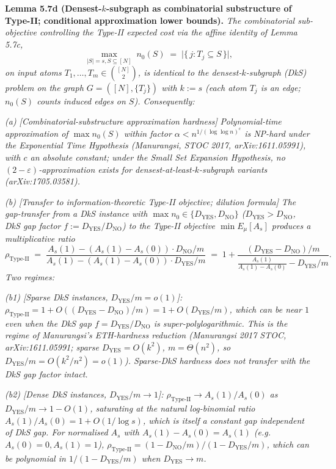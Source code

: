 \documentclass[
]{article}
\begin{document}
\textbf{Lemma 5.7d (Densest-$k$-subgraph as combinatorial substructure
of Type-II; conditional approximation lower bounds).}
\emph{The combinatorial sub-objective controlling the Type-II
expected cost via the affine identity of Lemma 5.7c,}
\[
\max_{|S| = s, S \subseteq [N]} \;
n_0(S) \;=\; \bigl|\{\, j : T_j \subseteq S \,\}\bigr|,
\]
\emph{on input atoms $T_1, \ldots, T_m \in \binom{[N]}{2}$, is
identical to the \emph{densest-$k$-subgraph (DkS) problem} on the
graph $G = ([N], \{T_j\})$ with $k := s$ (each atom $T_j$ is an
edge; $n_0(S)$ counts induced edges on $S$). Consequently:}

\emph{(a) [Combinatorial-substructure approximation hardness]}
\emph{Polynomial-time approximation of $\max n_0(S)$ within factor
$\alpha < n^{1/(\log \log n)^c}$ is NP-hard under the
Exponential Time Hypothesis (Manurangsi, STOC 2017,
arXiv:1611.05991), with $c$ an absolute constant; under the
Small Set Expansion Hypothesis, no $(2 - \varepsilon)$-approximation
exists for densest-at-least-$k$-subgraph variants
(arXiv:1705.03581).}

\emph{(b) [Transfer to information-theoretic Type-II objective; dilution
formula]}
\emph{The gap-transfer from a DkS instance with $\max n_0 \in
\{D_{\mathrm{YES}}, D_{\mathrm{NO}}\}$ ($D_{\mathrm{YES}} > D_{\mathrm{NO}}$,
DkS gap factor $f := D_{\mathrm{YES}} / D_{\mathrm{NO}}$) to the
Type-II objective $\min E_\mu[A_s]$ produces a multiplicative ratio}
\[
\rho_{\mathrm{Type\text{-}II}}
\;=\; \frac{A_s(1) - (A_s(1) - A_s(0)) \cdot D_{\mathrm{NO}}/m}
           {A_s(1) - (A_s(1) - A_s(0)) \cdot D_{\mathrm{YES}}/m}
\;=\;
1 + \frac{(D_{\mathrm{YES}} - D_{\mathrm{NO}})/m}
         {\frac{A_s(1)}{A_s(1) - A_s(0)} - D_{\mathrm{YES}}/m}.
\]
\emph{Two regimes:}

\emph{(b1) [Sparse DkS instances, $D_{\mathrm{YES}}/m = o(1)$]:
$\rho_{\mathrm{Type\text{-}II}} = 1 + O((D_{\mathrm{YES}} - D_{\mathrm{NO}})/m)
= 1 + O(D_{\mathrm{YES}}/m)$, which can be near $1$ even when the DkS gap
$f = D_{\mathrm{YES}}/D_{\mathrm{NO}}$ is super-polylogarithmic. This is
the regime of Manurangsi's ETH-hardness reduction (Manurangsi 2017
STOC, arXiv:1611.05991; sparse $D_{\mathrm{YES}} = O(k^2)$, $m = \Theta(n^2)$,
so $D_{\mathrm{YES}}/m = O(k^2/n^2) = o(1)$). \emph{Sparse-DkS hardness
does not transfer with the DkS gap factor intact}.}

\emph{(b2) [Dense DkS instances, $D_{\mathrm{YES}}/m \to 1$]:
$\rho_{\mathrm{Type\text{-}II}} \to A_s(1)/A_s(0)$ as
$D_{\mathrm{YES}}/m \to 1 - O(1)$, saturating at the natural log-binomial
ratio $A_s(1)/A_s(0) = 1 + O(1/\log s)$, which is itself a constant
gap independent of DkS gap. For \emph{normalised} $A_s$ with
$A_s(1) - A_s(0) = A_s(1)$ (e.g.\ $A_s(0) = 0, A_s(1) = 1$),
$\rho_{\mathrm{Type\text{-}II}} = (1 - D_{\mathrm{NO}}/m)/(1 - D_{\mathrm{YES}}/m)$,
which can be polynomial in $1/(1 - D_{\mathrm{YES}}/m)$ when
$D_{\mathrm{YES}} \to m$.}
\end{document}
